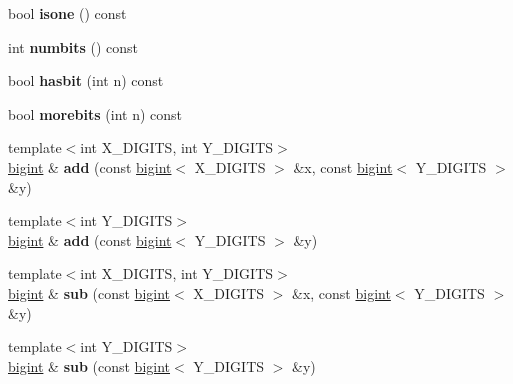 \begin{DoxyCompactItemize}
\mbox{\label{structbigint_a9eab9fc59fd94f8864f872dcf43db5f6}} 
bool {\bfseries isone} () const
\item 
\mbox{\label{structbigint_a6b30764ad71fc751522c2d88e8f51469}} 
int {\bfseries numbits} () const
\item 
\mbox{\label{structbigint_a8fc7a7e90cf0a50c0ad2154467622ca1}} 
bool {\bfseries hasbit} (int n) const
\item 
\mbox{\label{structbigint_a1f5588d9e62942ef3ca83996fc09eda9}} 
bool {\bfseries morebits} (int n) const
\item 
\mbox{\label{structbigint_a83de2e0a69faa39b852074a3c9f9c428}} 
{\footnotesize template$<$int X\+\_\+\+D\+I\+G\+I\+TS, int Y\+\_\+\+D\+I\+G\+I\+TS$>$ }\\\hyperlink{structbigint}{bigint} \& {\bfseries add} (const \hyperlink{structbigint}{bigint}$<$ X\+\_\+\+D\+I\+G\+I\+TS $>$ \&x, const \hyperlink{structbigint}{bigint}$<$ Y\+\_\+\+D\+I\+G\+I\+TS $>$ \&y)
\item 
\mbox{\label{structbigint_af39bc07861dec7beb1113f87c1210897}} 
{\footnotesize template$<$int Y\+\_\+\+D\+I\+G\+I\+TS$>$ }\\\hyperlink{structbigint}{bigint} \& {\bfseries add} (const \hyperlink{structbigint}{bigint}$<$ Y\+\_\+\+D\+I\+G\+I\+TS $>$ \&y)
\item 
\mbox{\label{structbigint_a61d22457b7cefdcbc901c48ef4e0d6ac}} 
{\footnotesize template$<$int X\+\_\+\+D\+I\+G\+I\+TS, int Y\+\_\+\+D\+I\+G\+I\+TS$>$ }\\\hyperlink{structbigint}{bigint} \& {\bfseries sub} (const \hyperlink{structbigint}{bigint}$<$ X\+\_\+\+D\+I\+G\+I\+TS $>$ \&x, const \hyperlink{structbigint}{bigint}$<$ Y\+\_\+\+D\+I\+G\+I\+TS $>$ \&y)
\item 
\mbox{\label{structbigint_ae78b03cf65e8dc3f83f295666db944d0}} 
{\footnotesize template$<$int Y\+\_\+\+D\+I\+G\+I\+TS$>$ }\\\hyperlink{structbigint}{bigint} \& {\bfseries sub} (const \hyperlink{structbigint}{bigint}$<$ Y\+\_\+\+D\+I\+G\+I\+TS $>$ \&y)
\item 

\end{DoxyCompactItemize}
